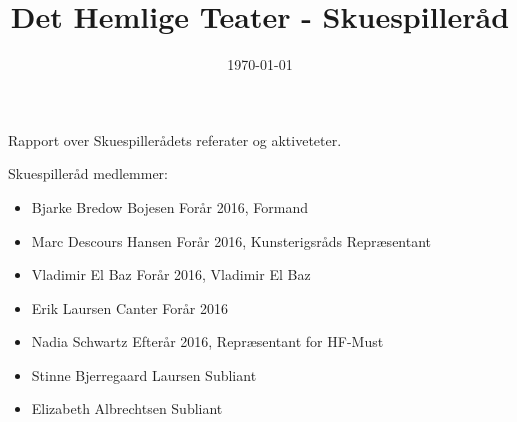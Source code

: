 \documentclass[12pt, a4paper]{article}
\title{Det Hemlige Teater - Skuespilleråd}
\date{\today}
\begin{document}
\listoftodos
\maketitle
\begin{center}
  Rapport over Skuespillerådets referater og aktiveteter.
\end{center}
\vfill
Skuespilleråd medlemmer:
\begin{itemize}
  \item Bjarke Bredow Bojesen \dotfill Forår 2016, Formand
  \item Marc Descours Hansen \dotfill Forår 2016, Kunsterigsråds Repræsentant
  \item Vladimir El Baz \dotfill Forår 2016, Vladimir El Baz
  \item Erik Laursen Canter \dotfill Forår 2016
  \item Nadia Schwartz \dotfill Efterår 2016, Repræsentant for HF-Must
  \item Stinne Bjerregaard Laursen \dotfill Subliant
  \item Elizabeth Albrechtsen \dotfill Subliant
\end{itemize}


\end{document}
